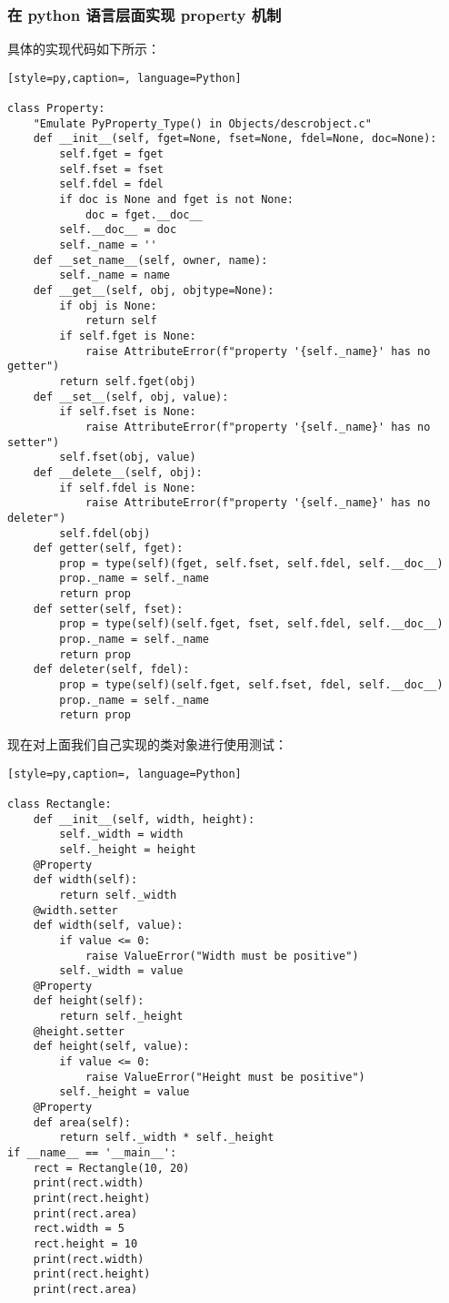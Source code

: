 \subsubsection{在 python 语言层面实现 property 机制}
具体的实现代码如下所示：
\begin{lstlisting}[style=py,caption=, language=Python]

class Property:
    "Emulate PyProperty_Type() in Objects/descrobject.c"
    def __init__(self, fget=None, fset=None, fdel=None, doc=None):
        self.fget = fget
        self.fset = fset
        self.fdel = fdel
        if doc is None and fget is not None:
            doc = fget.__doc__
        self.__doc__ = doc
        self._name = ''
    def __set_name__(self, owner, name):
        self._name = name
    def __get__(self, obj, objtype=None):
        if obj is None:
            return self
        if self.fget is None:
            raise AttributeError(f"property '{self._name}' has no getter")
        return self.fget(obj)
    def __set__(self, obj, value):
        if self.fset is None:
            raise AttributeError(f"property '{self._name}' has no setter")
        self.fset(obj, value)
    def __delete__(self, obj):
        if self.fdel is None:
            raise AttributeError(f"property '{self._name}' has no deleter")
        self.fdel(obj)
    def getter(self, fget):
        prop = type(self)(fget, self.fset, self.fdel, self.__doc__)
        prop._name = self._name
        return prop
    def setter(self, fset):
        prop = type(self)(self.fget, fset, self.fdel, self.__doc__)
        prop._name = self._name
        return prop
    def deleter(self, fdel):
        prop = type(self)(self.fget, self.fset, fdel, self.__doc__)
        prop._name = self._name
        return prop
\end{lstlisting}
现在对上面我们自己实现的类对象进行使用测试：
\begin{lstlisting}[style=py,caption=, language=Python]

class Rectangle:
    def __init__(self, width, height):
        self._width = width
        self._height = height
    @Property
    def width(self):
        return self._width
    @width.setter
    def width(self, value):
        if value <= 0:
            raise ValueError("Width must be positive")
        self._width = value
    @Property
    def height(self):
        return self._height
    @height.setter
    def height(self, value):
        if value <= 0:
            raise ValueError("Height must be positive")
        self._height = value
    @Property
    def area(self):
        return self._width * self._height
if __name__ == '__main__':
    rect = Rectangle(10, 20)
    print(rect.width)
    print(rect.height)
    print(rect.area)
    rect.width = 5
    rect.height = 10
    print(rect.width)
    print(rect.height)
    print(rect.area)
\end{lstlisting}
